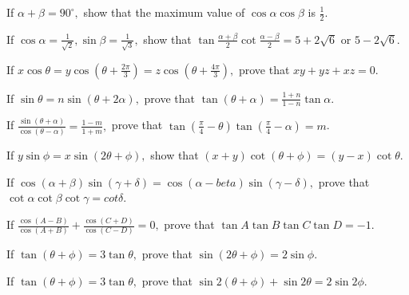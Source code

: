 \item If $\alpha + \beta = 90^\circ,$ show that the maximum value of $\cos\alpha\cos\beta$ is $\frac{1}{2}$.

\item If $\cos\alpha = \frac{1}{\sqrt{2}}, \sin\beta = \frac{1}{\sqrt{3}},$ show that $\tan\frac{\alpha +
    \beta}{2}\cot\frac{\alpha - \beta}{2} = 5 + 2\sqrt{6}$ or $5- 2\sqrt{6 }$.

\item If $x\cos\theta = y\cos\left(\theta + \frac{2\pi}{3}\right) = z\cos\left(\theta + \frac{4\pi}{3}\right),$ prove that
    $xy + yz + xz = 0$.

\item If $\sin\theta = n\sin(\theta + 2\alpha),$ prove that $\tan(\theta + \alpha) = \frac{1 + n}{1 - n}\tan\alpha$.

\item If $\frac{\sin(\theta + \alpha)}{\cos(\theta - \alpha)} = \frac{1 - m}{1 + m},$ prove that $\tan\left(\frac{\pi}{4}
    - \theta\right)\tan\left(\frac{\pi}{4} - \alpha\right) = m$.

\item If $y\sin\phi = x\sin(2\theta + \phi),$ show that $(x + y)\cot(\theta + \phi) = (y - x)\cot\theta$.

\item If $\cos(\alpha + \beta)\sin(\gamma + \delta) = \cos(\alpha - beta)\sin(\gamma - \delta),$ prove that
    $\cot\alpha\cot\beta\cot\gamma = cot\delta$.

\item If $\frac{\cos(A - B)}{\cos(A + B)} + \frac{\cos(C + D)}{\cos(C - D)} = 0,$ prove that $\tan A\tan B\tan C\tan D =
    -1$.

\item If $\tan(\theta + \phi) = 3\tan\theta,$ prove that $\sin(2\theta + \phi) = 2\sin\phi$.

\item If $\tan(\theta + \phi) = 3\tan\theta,$ prove that $\sin2(\theta + \phi) + \sin2\theta = 2\sin2\phi$.
\stopitemize